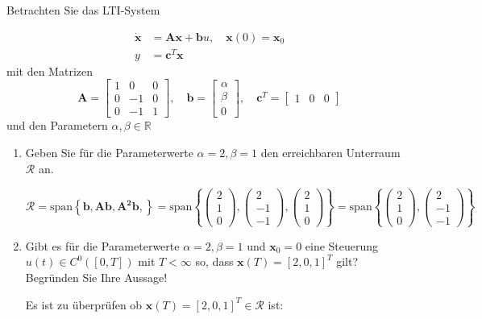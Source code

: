 \documentclass[crop=false]{standalone}
\begin{document}
\begin{task}
Betrachten Sie das LTI-System

$$ 
\begin{aligned} \dot{\mathbf{x}} &=\mathbf{A x}+\mathbf{b} u, \quad \mathbf{x}(0)=\mathbf{x}_{0} \\ y &=\mathbf{c}^{T} \mathbf{x} \end{aligned}
 $$
mit den Matrizen
\[
\mathbf{A}=\left[\begin{array}{ccc}{1} & {0} & {0} \\ {0} & {-1} & {0} \\ {0} & {-1} & {1}\end{array}\right], \quad \mathbf{b}=\left[\begin{array}{c}{\alpha} \\ {\beta} \\ {0}\end{array}\right], \quad \mathbf{c}^{T}=\left[\begin{array}{lll}{1} & {0} & {0}\end{array}\right]
\]
und den Parametern $\alpha, \beta \in \mathbb{R}$
 \begin{enumerate}[i]
  \item Geben Sie für die Parameterwerte $\alpha=2, \beta=1$ den erreichbaren Unterraum $\mathcal{R}$ an.
\begin{solution}
\[ \mathcal{R} = \text{span}\left\{ \mathbf{b}, \mathbf{Ab}, \mathbf{A^2 b}, \right\} =
\text{span}\left\{
\begin{pmatrix}
2 \\ 1 \\ 0
\end{pmatrix},
\begin{pmatrix}
2 \\ -1 \\ -1
\end{pmatrix},
\begin{pmatrix}
2 \\ 1 \\ 0
\end{pmatrix}
 \right\}
 =\text{span}\left\{
\begin{pmatrix}
2 \\ 1 \\ 0
\end{pmatrix},
\begin{pmatrix}
2 \\ -1 \\ -1
\end{pmatrix}
 \right\}
 \]
\end{solution}
  \item Gibt es für die Parameterwerte $\alpha=2, \beta=1$ und $\mathbf{x}_{0}=0$ eine Steuerung $u(t) \in C^{0}([0, T])$ mit $T<\infty$ so, dass $\mathbf{x}(T)=[2,0,1]^{T}$ gilt? Begründen Sie Ihre Aussage!
\begin{solution}
Es ist zu überprüfen ob $\mathbf{x}(T)=[2,0,1]^{T} \in \mathcal{R}$ ist:


\end{solution}
\end{enumerate}
\end{task}
\end{document}
